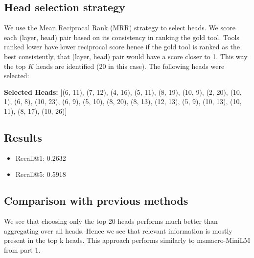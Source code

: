 \documentclass[11pt]{article}
\begin{document}
\subsection{Head selection strategy}

We use the Mean Reciprocal Rank (MRR) strategy to select heads. We score each (layer, head) pair based on its consistency in ranking the gold tool. Tools ranked lower have lower reciprocal score hence if the gold tool is ranked as the best consistently, that (layer, head) pair would have a score closer to 1. This way the top $K$ heads are identified (20 in this case). The following heads were selected:
\newline

\textbf{Selected Heads:}
[(6, 11), (7, 12), (4, 16), (5, 11), (8, 19), (10, 9), (2, 20), (10, 1), (6, 8), (10, 23), (6, 9), (5, 10), (8, 20), (8, 13), (12, 13), (5, 9), (10, 13), (10, 11), (8, 17), (10, 26)]


\subsection{Results}
\begin{itemize}
    \item Recall@1: 0.2632
    \item Recall@5: 0.5918
\end{itemize}

\subsection{Comparison with previous methods}

We see that choosing only the top 20 heads performs much better than aggregating over all heads. Hence we see that relevant information is mostly present in the top k heads. This approach performs similarly to msmacro-MiniLM from part 1. 
\end{document}
